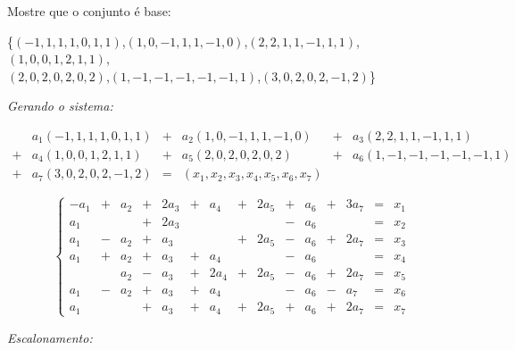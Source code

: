 \documentclass[11pt]{article}
\newenvironment{question}[1]
  {\par\addvspace{\medskipamount}
   \noindent\makebox[0pt][r]{\textbf{#1)} }\ignorespaces}
  {\par\addvspace{\medskipamount}}
\begin{document}
\begin{question}{4}

Mostre que o conjunto é base:

\{$(-1,1,1,1,0,1,1)$,$(1,0,-1,1,1,-1,0)$,$(2,2,1,1,-1,1,1)$,$(1,0,0,1,2,1,1)$,\\
$(2,0,2,0,2,0,2)$,$(1,-1,-1,-1,-1,-1,1)$,$(3,0,2,0,2,-1,2)$\}

\bigskip
\textit{Gerando o sistema:} 

$$
\begin{array}{clclcl}
    &a_1(-1,1,1,1,0,1,1) &+ &a_2(1,0,-1,1,1,-1,0) &+ &a_3(2,2,1,1,-1,1,1)\\
+ &a_4(1,0,0,1,2,1,1) &+ &a_5(2,0,2,0,2,0,2)  &+ &a_6(1,-1,-1,-1,-1,-1,1)\\
+ &a_7(3,0,2,0,2,-1,2) &= &(x_1,x_2,x_3,x_4,x_5,x_6,x_7) & &
\end{array}
$$

$$
\left\{\begin{array}{rcrcrcrcrcrcrcl}
    -a_1 &+ &a_2  &+ &2a_3 &+ &a_4  &+ &2a_5 &+ &a_6 &+ &3a_7 &= &x_1\\
     a_1 &  &     &+ &2a_3 &  &     &  &     &- &a_6 &  &     &= &x_2\\
     a_1 &- &a_2  &+ &a_3  &  &     &+ &2a_5 &- &a_6 &+ &2a_7 &= &x_3\\
     a_1 &+ &a_2  &+ &a_3  &+ &a_4  &  &     &- &a_6 &  &     &= &x_4\\
         &  &a_2  &- &a_3  &+ &2a_4 &+ &2a_5 &- &a_6 &+ &2a_7 &= &x_5\\
     a_1 &- &a_2  &+ &a_3  &+ &a_4  &  &     &- &a_6 &- &a_7  &= &x_6\\
     a_1 &  &     &+ &a_3  &+ &a_4  &+ &2a_5 &+ &a_6 &+ &2a_7 &= &x_7
\end{array}\right.
$$

\newpage
\textit{Escalonamento:}


\end{question}
\end{document}
